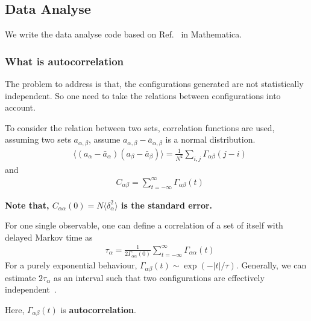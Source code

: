 \subsection{\label{sec:DataAnalyse}Data Analyse}

We write the data analyse code based on Ref.~\cite{autocorrelation} in Mathematica.

\subsubsection{What is autocorrelation}

The problem to address is that, the configurations generated are not statistically independent. So one need to take the relations between configurations into account.

To consider the relation between two sets, correlation functions are used, assuming two sets $a_{\alpha,\beta}$, assume $a_{\alpha,\beta}-\bar{a}_{\alpha,\beta}$ is a normal distribution.
\begin{equation}
\begin{split}
&\langle (a_{\alpha}-\bar{a}_{\alpha})(a_{\beta}-\bar{a}_{\beta})\rangle = \frac{1}{N^2}\sum _{i,j}\Gamma _{\alpha\beta}(j-i)
\end{split}
\end{equation}
and
\begin{equation}
\begin{split}
&C_{\alpha\beta}=\sum _{t=-\infty}^{\infty}\Gamma _{\alpha\beta}(t)
\end{split}
\end{equation}

\textbf{Note that, $C_{\alpha\alpha}(0)=N\langle \delta _{\alpha}^2\rangle$ is the standard error.}

For one single observable, one can define a correlation of a set of itself with delayed Markov time as
\begin{equation}
\begin{split}
&\tau _{\alpha}=\frac{1}{2\Gamma _{\alpha\alpha}(0)} \sum _{t=-\infty}^{\infty}\Gamma _{\alpha\alpha}(t)
\end{split}
\end{equation}
For a purely exponential behaviour, $\Gamma _{\alpha\beta}(t)\sim \exp (-|t|/\tau)$. Generally, we can estimate $2\tau _{\alpha}$ as an interval such that two configurations are effectively independent~\cite{autocorrelation}.

Here, $\Gamma _{\alpha\beta}(t)$ is \textbf{autocorrelation}.

